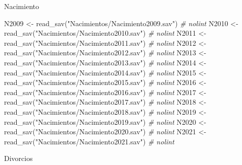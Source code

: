 \documentclass[
]{article}
\newenvironment{Shaded}{\begin{snugshade}}{\end{snugshade}}
\newcommand{\CommentTok}[1]{\textcolor[rgb]{0.56,0.35,0.01}{\textit{#1}}}
\newcommand{\FunctionTok}[1]{\textcolor[rgb]{0.00,0.00,0.00}{#1}}
\newcommand{\NormalTok}[1]{#1}
\newcommand{\OtherTok}[1]{\textcolor[rgb]{0.56,0.35,0.01}{#1}}
\newcommand{\StringTok}[1]{\textcolor[rgb]{0.31,0.60,0.02}{#1}}
\begin{document}
Nacimiento

\begin{Shaded}
\begin{Highlighting}[]
\NormalTok{N2009 }\OtherTok{\textless{}{-}} \FunctionTok{read\_sav}\NormalTok{(}\StringTok{"Nacimientos/Nacimiento2009.sav"}\NormalTok{) }\CommentTok{\# nolint}
\NormalTok{N2010 }\OtherTok{\textless{}{-}} \FunctionTok{read\_sav}\NormalTok{(}\StringTok{"Nacimientos/Nacimiento2010.sav"}\NormalTok{) }\CommentTok{\# nolint}
\NormalTok{N2011 }\OtherTok{\textless{}{-}} \FunctionTok{read\_sav}\NormalTok{(}\StringTok{"Nacimientos/Nacimiento2011.sav"}\NormalTok{) }\CommentTok{\# nolint}
\NormalTok{N2012 }\OtherTok{\textless{}{-}} \FunctionTok{read\_sav}\NormalTok{(}\StringTok{"Nacimientos/Nacimiento2012.sav"}\NormalTok{) }\CommentTok{\# nolint}
\NormalTok{N2013 }\OtherTok{\textless{}{-}} \FunctionTok{read\_sav}\NormalTok{(}\StringTok{"Nacimientos/Nacimiento2013.sav"}\NormalTok{) }\CommentTok{\# nolint}
\NormalTok{N2014 }\OtherTok{\textless{}{-}} \FunctionTok{read\_sav}\NormalTok{(}\StringTok{"Nacimientos/Nacimiento2014.sav"}\NormalTok{) }\CommentTok{\# nolint}
\NormalTok{N2015 }\OtherTok{\textless{}{-}} \FunctionTok{read\_sav}\NormalTok{(}\StringTok{"Nacimientos/Nacimiento2015.sav"}\NormalTok{) }\CommentTok{\# nolint}
\NormalTok{N2016 }\OtherTok{\textless{}{-}} \FunctionTok{read\_sav}\NormalTok{(}\StringTok{"Nacimientos/Nacimiento2016.sav"}\NormalTok{) }\CommentTok{\# nolint}
\NormalTok{N2017 }\OtherTok{\textless{}{-}} \FunctionTok{read\_sav}\NormalTok{(}\StringTok{"Nacimientos/Nacimiento2017.sav"}\NormalTok{) }\CommentTok{\# nolint}
\NormalTok{N2018 }\OtherTok{\textless{}{-}} \FunctionTok{read\_sav}\NormalTok{(}\StringTok{"Nacimientos/Nacimiento2018.sav"}\NormalTok{) }\CommentTok{\# nolint}
\NormalTok{N2019 }\OtherTok{\textless{}{-}} \FunctionTok{read\_sav}\NormalTok{(}\StringTok{"Nacimientos/Nacimiento2019.sav"}\NormalTok{) }\CommentTok{\# nolint}
\NormalTok{N2020 }\OtherTok{\textless{}{-}} \FunctionTok{read\_sav}\NormalTok{(}\StringTok{"Nacimientos/Nacimiento2020.sav"}\NormalTok{) }\CommentTok{\# nolint}
\NormalTok{N2021 }\OtherTok{\textless{}{-}} \FunctionTok{read\_sav}\NormalTok{(}\StringTok{"Nacimientos/Nacimiento2021.sav"}\NormalTok{) }\CommentTok{\# nolint}
\end{Highlighting}
\end{Shaded}

Divorcios
\end{document}
